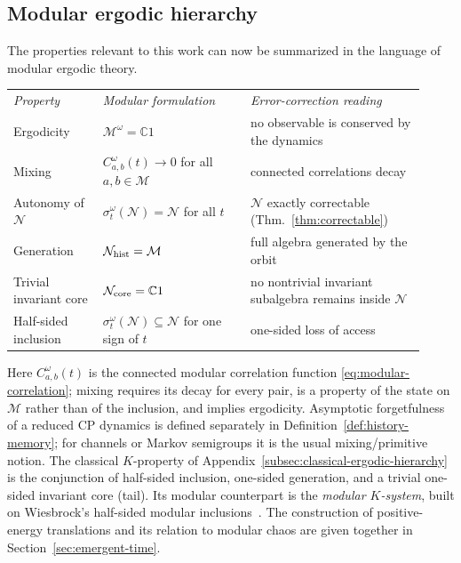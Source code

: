 \documentclass[a4paper,11pt]{article}
\theoremstyle{definition}
\newcommand{\mN}{\mathcal{N}}
\newcommand{\mM}{\mathcal{M}}
\begin{document}
\subsection{Modular ergodic hierarchy}\label{subsec:QEC-hierarchy}

The properties relevant to this work can now be summarized in the language of modular ergodic theory.
\begin{center}
\begin{tabular}{@{}>{\raggedright\arraybackslash}p{0.20\linewidth}>{\raggedright\arraybackslash}p{0.33\linewidth}>{\raggedright\arraybackslash}p{0.39\linewidth}@{}}
 \textit{Property} & \textit{Modular formulation} & \textit{Error-correction reading}\\[4pt]
 Ergodicity & $\mM^\omega=\mathbb C1$ & no observable is conserved by the dynamics\\
 Mixing & $C_{a,b}^\omega(t)\to0$ for all $a,b\in\mM$ & connected correlations decay\\
 Autonomy of $\mN$ & $\sigma^\omega_t(\mN)=\mN$ for all $t$ & $\mN$ exactly correctable (Thm.~\ref{thm:correctable})\\
 Generation & $\mN_{\rm hist}=\mM$ & full algebra generated by the orbit\\
 Trivial invariant core & $\mN_{\rm core}=\mathbb C1$ & no nontrivial invariant subalgebra remains inside $\mN$\\
 Half-sided inclusion & $\sigma^\omega_t(\mN)\subseteq\mN$ for one sign of $t$ & one-sided loss of access
\end{tabular}
\end{center}
Here $C^\omega_{a,b}(t)$ is the connected modular correlation function \eqref{eq:modular-correlation}; mixing requires its decay for every pair, is a property of the state on $\mM$ rather than of the inclusion, and implies ergodicity. Asymptotic forgetfulness of a reduced CP dynamics is defined separately in Definition~\ref{def:history-memory}; for channels or Markov semigroups it is the usual mixing/primitive notion. The classical $K$-property of Appendix~\ref{subsec:classical-ergodic-hierarchy} is the conjunction of half-sided inclusion, one-sided generation, and a trivial one-sided invariant core (tail). Its modular counterpart is the \emph{modular $K$-system}, built on
Wiesbrock's half-sided modular inclusions~\cite{Wiesbrock1993}.
The construction of positive-energy translations and its relation to
modular chaos are given together in Section~\ref{sec:emergent-time}.
\end{document}
